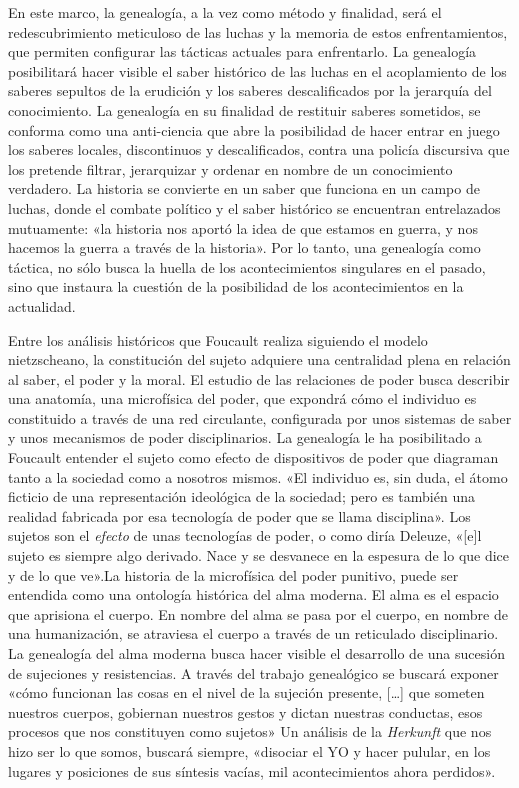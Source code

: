 En este marco, la genealogía, a la vez como método y finalidad, será el redescubrimiento meticuloso de las luchas y la memoria de estos enfrentamientos, que permiten configurar las tácticas actuales para enfrentarlo. La genealogía posibilitará hacer visible el saber histórico de las luchas en el acoplamiento de los saberes sepultos de la erudi­ción y los saberes descalificados por la jerarquía del cono­cimiento. La genealogía en su finalidad de restituir saberes sometidos, se conforma como una anti-ciencia que abre la posibilidad de hacer entrar en juego los saberes locales, discontinuos y descalificados, contra una policía discursiva que los pretende filtrar, jerarquizar y ordenar en nombre de un conocimiento verdadero. La historia se convierte en un saber que funciona en un campo de luchas, donde el combate político y el saber histórico se encuentran entrelazados mutuamente: «la historia nos aportó la idea de que estamos en guerra, y nos hacemos la guerra a través de la historia». Por lo tanto, una genealogía como táctica, no sólo busca la huella de los acontecimientos singulares en el pasado, sino que instaura la cuestión de la posibilidad de los acontecimientos en la actualidad.

Entre los análisis históricos que Foucault realiza siguiendo el modelo nietzscheano, la constitución del sujeto adquiere una centralidad plena en relación al saber, el poder y la moral. El estudio de las relaciones de poder busca describir una anatomía, una microfísica del poder, que expondrá cómo el individuo es constituido a través de una red circulante, configurada por unos sistemas de saber y unos mecanismos de poder disciplinarios. La genealogía le ha posibilitado a Foucault entender el sujeto como efecto de dispositivos de poder que diagraman tanto a la sociedad como a nosotros mismos. «El individuo es, sin duda, el átomo ficticio de una representación ideológica de la sociedad; pero es también una realidad fabricada por esa tecnología de poder que se llama disciplina». Los sujetos son el \emph{efecto} de unas tecnologías de poder, o como diría Deleuze, «{[}e{]}l sujeto es siempre algo derivado. Nace y se desvanece en la espesura de lo que dice y de lo que ve».La historia de la microfísica del poder punitivo, puede ser entendida como una ontología histórica del alma moderna. El alma es el espacio que aprisiona el cuerpo. En nombre del alma se pasa por el cuerpo, en nombre de una humanización, se atraviesa el cuerpo a través de un reticulado disciplinario. La genealogía del alma moderna busca hacer visible el desarrollo de una sucesión de sujeciones y resistencias. A través del trabajo genealógico se buscará exponer «cómo funcionan las cosas en el nivel de la sujeción presente, {[}\ldots{]} que someten nuestros cuerpos, gobiernan nuestros gestos y dictan nuestras conductas, esos procesos que nos constituyen como sujetos» Un análisis de la \emph{Herkunft} que nos hizo ser lo que somos, buscará siempre, «disociar el YO y hacer pulular, en los lugares y posiciones de sus síntesis vacías, mil acontecimientos ahora perdidos».


